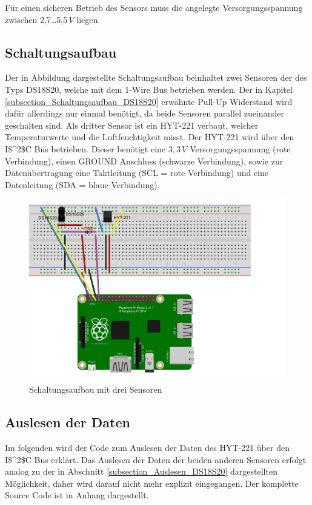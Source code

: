 Für einen sicheren Betrieb des Sensors muss die angelegte Versorgungsspannung zwischen 2,7\dots 5,5\,$V$ liegen.

\subsection{Schaltungsaufbau}
\label{subsection_Schaltungsaufbau_HYT221}
Der in Abbildung dargestellte Schaltungsaufbau beinhaltet zwei Sensoren der des Typs DS18S20, welche mit dem 1-Wire Bus betrieben werden. Der in Kapitel \ref{subsection_Schaltungsaufbau_DS18S20} erwähnte Pull-Up Widerstand wird dafür allerdings nur einmal benötigt, da beide Sensoren parallel zueinander geschalten sind. Als dritter Sensor ist ein HYT-221 verbaut, welcher Temperaturwerte und die Luftfeuchtigkeit misst. Der HYT-221 wird über den \ac{I$^2$C} Bus betrieben. Dieser benötigt eine $3,3\,V$ Versorgungsspannung (rote Verbindung), einen GROUND Anschluss (schwarze Verbindung), sowie zur Datenübertragung eine Taktleitung (SCL = rote Verbindung) und eine Datenleitung (SDA = blaue Verbindung).

\begin{figure}[!h] 
  \centering
     \includegraphics[scale=.72]{BilderAllgemein/Schaltung_HYT221.png}
  \caption{Schaltungsaufbau mit drei Sensoren}
  \label{Abb_Schaltungsaufbau_HYT221}
\end{figure}

\subsection{Auslesen der Daten}
\label{subsection_Auslesen der Daten HYT221}
Im folgenden wird der Code zum Auslesen der Daten des HYT-221 über den \ac{I$^2$C} Bus erklärt. Das Auslesen der Daten der beiden anderen Sensoren erfolgt analog zu der in Abschnitt \ref{subsection_Auslesen_DS18S20} dargestellten Möglichkeit, daher wird darauf nicht mehr explizit eingegangen. Der komplette Source Code ist in Anhang dargestellt.

